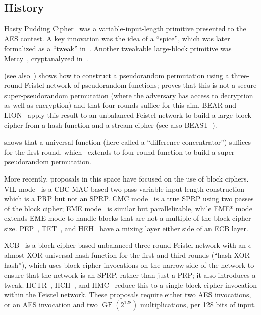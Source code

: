 \documentclass[journal=tosc,preprint,floatrow,submission]{iacrtrans}
\DeclareMathOperator{\GF}{GF}
\begin{document}
\subsection{History}

Hasty Pudding Cipher~\cite{hpc} was a variable-input-length primitive presented to the AES contest.
A key innovation
was the idea of a ``spice'', which was later formalized as a ``tweak'' in~\cite{tweakable}.
Another tweakable large-block primitive was Mercy~\cite{mercy},
cryptanalyzed in~\cite{mercycryptanalysis}.

\cite{luby-rackoff} (see also~\cite{maurer-luby-rackoff,ppdes})
shows how to construct a pseudorandom permutation using a three-round Feistel
network of pseudorandom functions;
proves that this is not a secure super-pseudorandom permutation (where the adversary
has access to decryption as well as encryption) and that four rounds suffice for this aim.
BEAR and LION~\cite{bearlion} apply this result to an unbalanced Feistel network to build a
large-block cipher from a hash function and a stream cipher (see also BEAST~\cite{beast}).

\cite{fasterlr} shows that a universal function (here called a ``difference concentrator'')
suffices for the first round, which~\cite{NaorReingold} extends to four-round function
to build a super-pseudorandom permutation.

More recently, proposals in this space have focused on the use of
block ciphers. VIL mode~\cite{brvil} is a CBC-MAC based two-pass variable-input-length construction which
is a PRP but not an SPRP. CMC mode~\cite{cmc} is a true SPRP using two passes of the block cipher;
EME mode~\cite{eme} is similar but parallelizable, while
EME* mode~\cite{emestar} extends EME mode to handle blocks that are not a multiple of the block
cipher size. PEP~\cite{pep}, TET~\cite{tet}, and HEH~\cite{heh} have a mixing layer either side of
an ECB layer.

XCB~\cite{xcb} is a block-cipher based unbalanced three-round Feistel network with an
$\epsilon$-almost-XOR-universal hash function for the first and third rounds
(``hash-XOR-hash''),
which uses block
cipher invocations on the narrow side of the network to ensure that the network is an SPRP, rather
than just a PRP; it also introduces a tweak.
HCTR~\cite{hctr,hctr2}, HCH~\cite{hch}, and HMC~\cite{hmc} reduce this to a single
block cipher invocation within the Feistel network.
These proposals require
either two AES invocations, or an AES invocation and two $\GF(2^{128})$ multiplications,
per 128 bits of input.
\end{document}
